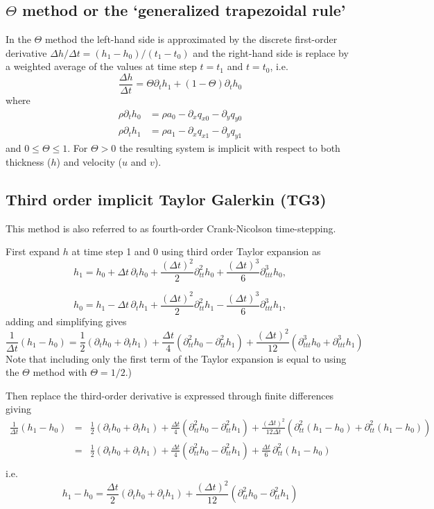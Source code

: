 \documentclass[10pt,a4paper]{book}
\newcommand{\p}{\partial}
\begin{document}
\subsection{$\Theta$ method or the `generalized trapezoidal rule'}

In the $\Theta$ method the left-hand side is approximated by the 
discrete first-order derivative $\Delta h/\Delta t=(h_1-h_0)/(t_1-t_0)$
and the right-hand side is replace by a weighted average of the values at time step $t=t_1$ and $t=t_0$, i.e.\
\[ \frac{\Delta h}{\Delta t}= \Theta \p_t h_1 +(1-\Theta) \p_t h_0  \]
where
\begin{align*}
\rho \p_t h_0&=\rho a_0-\p_x q_{x0} - \p_y q_{y0}\\
\rho \p_t h_1&=\rho a_1-\p_x q_{x1} - \p_y q_{y1}
\end{align*}
and $0 \le \Theta \le 1$. For $\Theta>0$ the resulting system is
implicit with respect to both thickness ($h$) and velocity ($u$ and
$v$).


\subsection{Third order implicit Taylor Galerkin (TG3)}
This method is also referred to as fourth-order Crank-Nicolson time-stepping.


First expand $h$ at time step 1 and 0 using third order Taylor expansion as
\[
h_1=h_0+ \Delta t \, \p_t h_0 + \frac{(\Delta t)^2}{2} \p^2_{tt} h_0 + \frac{(\Delta t)^3}{6} \p^3_{ttt} h_0 ,
\] 

\[
h_0=h_1- \Delta t \, \p_t h_1 + \frac{(\Delta t)^2}{2} \p^2_{tt} h_1  - \frac{(\Delta t)^3}{6} \p^3_{ttt} h_1,
\] 
adding and simplifying gives
\begin{equation}
\frac{1}{\Delta t}(h_1-h_0)= \frac{1}{2} (\p_t h_0+ \p_t h_1) + \frac{\Delta t}{4} (\p^2_{tt} h_0 - \p^2_{tt} h_1)
+\frac{(\Delta t)^2}{12} ( \p^3_{ttt} h_0 + \p^3_{ttt} h_1) 
\label{eq:fDt}
\end{equation}
Note that including  only the first term of the Taylor expansion is equal to using the $\Theta$ method with $\Theta=1/2$.)


Then replace the third-order derivative is expressed through finite differences giving
\begin{eqnarray*}
\frac{1}{\Delta t}(h_1-h_0)&=& 
\frac{1}{2} (\p_t h_0+ \p_t h_1) + \frac{\Delta t}{4} (\p^2_{tt} h_0 - \p^2_{tt} h_1) +\frac{(\Delta t)^2}{12 \Delta t} ( \p^2_{tt} (h_1-h_0) + \p^2_{tt} (h_1-h_0)) \\
&=& \frac{1}{2} (\p_t h_0+ \p_t h_1) + \frac{\Delta t}{4} (\p^2_{tt} h_0 - \p^2_{tt} h_1) +\frac{\Delta t}{6} \,\p^2_{tt} (h_1-h_0)  \\
\end{eqnarray*}
i.e.
\begin{equation}
h_1-h_0 =  \frac{\Delta t}{2} (\p_t h_0+ \p_t h_1) + \frac{(\Delta t)^2}{12} (\p^2_{tt} h_0 -\p^2_{tt} h_1)
\label{eq:three}
\end{equation}
 
\end{document}
